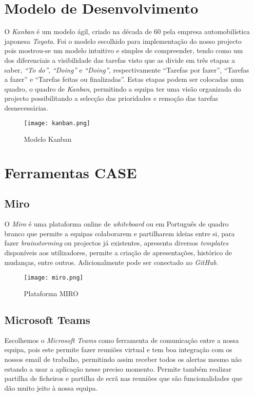 \documentclass[a4paper]{article}
\begin{document}
\section{Modelo de Desenvolvimento}
O \textit{Kanban} é um modelo ágil, criado na década de 60 pela empresa automobilística japonesa \textit{Toyota}.
Foi o modelo escolhido para implementação do nosso projecto pois mostrou-se um modelo intuitivo e simples de compreender, tendo como um dos diferenciais a visibilidade das tarefas visto que as divide em três etapas a saber, \textit{“To do”}, \textit{“Doing”} e \textit{“Doing”}, respectivamente “Tarefas por fazer”, “Tarefas a fazer” e “Tarefas feitas ou finalizadas”. Estas etapas podem ser colocadas num quadro, o quadro de \textit{Kanban}, permitindo a equipa ter uma visão organizada do projecto possibilitando a selecção das prioridades e remoção das tarefas desnecessárias. \cite{Kanban}

\begin{figure}[H]
    \centering
    \texttt{[image: kanban.png]}
    \caption{Modelo Kanban\texttrademark}
    \label{fig:kanban}
\end{figure}

\section{Ferramentas CASE}
\subsection{Miro}
O \textit{Miro} é uma plataforma online de \textit{whiteboard} ou em Português de quadro branco que permite a equipas colaborarem e partilharem ideias entre si, para fazer 
\textit{brainstorming} ou projectos já existentes, apresenta diversos \textit{templates} disponíveis aos utilizadores, permite a criação de apresentações, histórico de mudanças, entre outros. Adicionalmente pode ser conectado ao \textit{GitHub}.

\begin{figure}[H]
    \centering
    \texttt{[image: miro.png]}
    \caption{Plataforma MIRO\texttrademark}
    \label{fig:miro}
\end{figure}

\subsection{Microsoft Teams}
Escolhemos o \textit{Microsoft Teams} como ferramenta de comunicação entre a nossa equipa, pois este permite fazer reuniões virtual e tem boa integração com os nossos email de trabalho, permitindo assim receber todos os alertas mesmo não estando a usar a aplicação nesse preciso momento.
Permite também realizar partilha de ficheiros e partilha de ecrã nas reuniões que são funcionalidades que dão muito jeito à nossa equipa.
\end{document}

